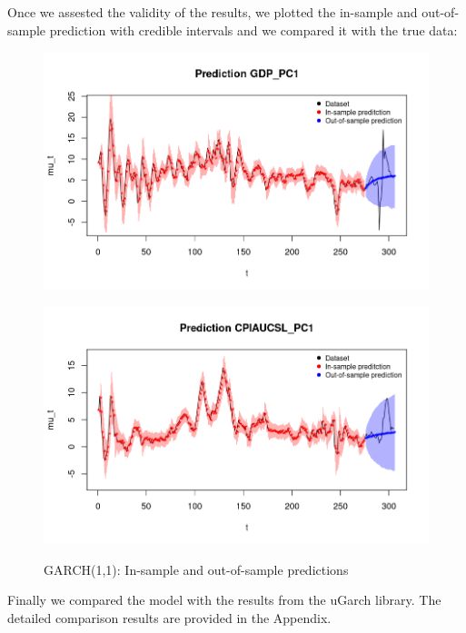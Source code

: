 Once we assested the validity of the results, we plotted the in-sample and out-of-sample prediction with credible intervals and we compared it with the true data:
\begin{figure}[h]
    \centering
    \begin{minipage}[t]{0.7\textwidth}
        \centering
        \includegraphics[width=\textwidth]{images/5-GARCH/gdp_prediction.png}
        \label{fig:GARCH_first}
    \end{minipage}
    \begin{minipage}[t]{0.7\textwidth}
        \centering
        \includegraphics[width=\textwidth]{images/5-GARCH/infl_prediction.png}
        \label{fig:GARCH_second}
    \end{minipage}
    \caption{GARCH(1,1): In-sample and out-of-sample predictions}
    \label{fig:GARCH_combined}
\end{figure}
Finally we compared the model with the results from the uGarch library. The detailed comparison results are provided in the Appendix. 
